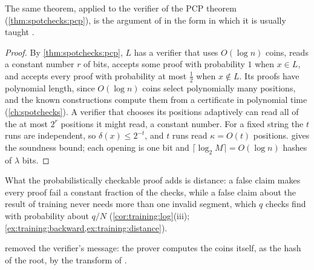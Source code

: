 \begin{refsection}
The same theorem, applied to the verifier of the PCP theorem (\cref{thm:spotchecks:pcp}), is the argument of \textcite{Kilian1992} in the form in which it is usually taught \parencite{Thaler2022}.


\begin{proof}
By \cref{thm:spotchecks:pcp}, $L$ has a verifier that uses $O(\log n)$ coins, reads a constant number $r$ of bits, accepts some proof with probability $1$ when $x\in L$, and accepts every proof with probability at most $\frac12$ when $x\notin L$. Its proofs have polynomial length, since $O(\log n)$ coins select polynomially many positions, and the known constructions compute them from a certificate in polynomial time (\cref{ch:spotchecks}). A verifier that chooses its positions adaptively can read all of the at most $2^r$ positions it might read, a constant number. For a fixed string the $t$ runs are independent, so $\delta(x)\le2^{-t}$, and $t$ runs read $\kappa=O(t)$ positions.  gives the soundness bound; each opening is one bit and $\lceil\log_2M\rceil=O(\log n)$ hashes of $\lambda$ bits.
\end{proof}

What the probabilistically checkable proof adds is distance: a false claim makes every proof fail a constant fraction of the checks, while a false claim about the result of training never needs more than one invalid segment, which $q$ checks find with probability about $q/N$ (\cref{cor:training:log}(iii); \cref{ex:training:backward,ex:training:distance}).

\Textcite{Micali2000} removed the verifier's message: the prover computes the coins itself, as the hash of the root, by the transform of \textcite{FiatShamir1986}.


\end{refsection}
